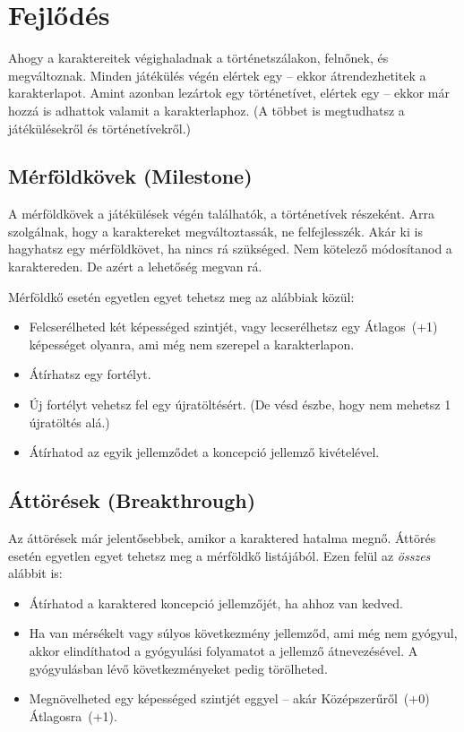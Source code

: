 \chapter{Fejlődés}

Ahogy a karaktereitek végighaladnak a történetszálakon, felnőnek, és megváltoznak. Minden játékülés végén elértek egy  -- ekkor átrendezhetitek a karakterlapot. Amint azonban lezártok egy történetívet, elértek egy  -- ekkor már hozzá is adhattok valamit a karakterlaphoz. (A  többet is megtudhatsz a játékülésekről és történetívekről.)

\section[Mérföldkövek]{Mérföldkövek (Milestone)}

A mérföldkövek a játékülések végén találhatók, a történetívek részeként. Arra szolgálnak, hogy a karaktereket megváltoztassák, ne felfejlesszék. Akár ki is hagyhatsz egy mérföldkövet, ha nincs rá szükséged. Nem kötelező módosítanod a karaktereden. De azért a lehetőség megvan rá.

Mérföldkő esetén egyetlen egyet tehetsz meg az alábbiak közül:

\begin{itemize}
    \item Felcserélheted két képességed szintjét, vagy lecserélhetsz egy Átlagos~(+1) képességet olyanra, ami még nem szerepel a karakterlapon.
    \item Átírhatsz egy fortélyt.
    \item Új fortélyt vehetsz fel egy újratöltésért. (De vésd észbe, hogy nem mehetsz 1 újratöltés alá.)
    \item Átírhatod az egyik jellemződet a koncepció jellemző kivételével.
\end{itemize}

\section[Áttörések]{Áttörések (Breakthrough)}

Az áttörések már jelentősebbek, amikor a karaktered hatalma megnő. Áttörés esetén egyetlen egyet tehetsz meg a mérföldkő listájából. Ezen felül az \emph{összes} alábbit is:

\begin{itemize}
    \item Átírhatod a karaktered koncepció jellemzőjét, ha ahhoz van kedved.
    \item Ha van mérsékelt vagy súlyos következmény jellemződ, ami még nem gyógyul, akkor elindíthatod a gyógyulási folyamatot a jellemző átnevezésével. A gyógyulásban lévő következményeket pedig törölheted.
    \item Megnövelheted egy képességed szintjét eggyel -- akár Középszerűről~(+0) Átlagosra~(+1).
\end{itemize}

